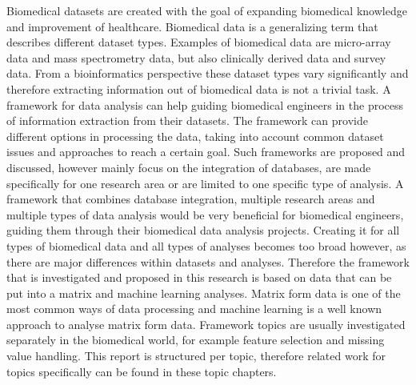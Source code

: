 \documentclass[10pt,a4paper]{report}
\begin{document}
	Biomedical datasets are created with the goal of expanding biomedical knowledge and improvement of healthcare. Biomedical data is a generalizing term that describes different dataset types\cite{gehlenborg2010visualization}. Examples of biomedical data are micro-array data\cite{brazma2001minimum} and mass spectrometry data\cite{cottrell1999probability, dettmer2007mass}, but also clinically derived data\cite{liu2012data, sittig2008grand} and survey data\cite{magni1990chronic}. From a bioinformatics perspective these dataset types vary significantly\cite{gehlenborg2010visualization} and therefore extracting information out of biomedical data is not a trivial task. A framework for data analysis can help guiding biomedical engineers in the process of information extraction from their datasets. The framework can provide different options in processing the data, taking into account common dataset issues\cite{bertolazzi2008logic, piatetsky2003microarray,lommen2009metalign} and approaches to reach a certain goal\cite{holzinger2014knowledge, wilkins2009proteomics}. Such frameworks are proposed and discussed, however mainly focus on the integration of databases\cite{teodoro2009biomedical, doi:10.1093/nar/gkm1037}, are made specifically for one research area\cite{sturn2002genesis, karnovsky2011metscape, tabas2012genecodis3} or are limited to one specific type of analysis\cite{faul2007g}. A framework that combines database integration, multiple research areas and multiple types of data analysis would be very beneficial for biomedical engineers, guiding them through their biomedical data analysis projects. Creating it for all types of biomedical data and all types of analyses becomes too broad however, as there are major differences within datasets and analyses. Therefore the framework that is investigated and proposed in this research is based on data that can be put into a matrix and machine learning analyses. Matrix form data is one of the most common ways of data processing and machine learning is a well known approach to analyse matrix form data.
	Framework topics are usually investigated separately in the biomedical world, for example feature selection\cite{baumgartner2006data, welthagen2005comprehensive} and missing value handling\cite{donders2006gentle, cartwright2003dealing, haukoos2007advanced}. This report is structured per topic, therefore related work for topics specifically can be found in these topic chapters.
	
\end{document}
